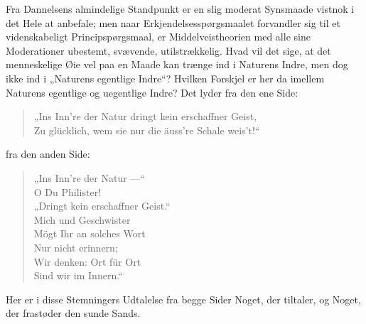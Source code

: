 \documentclass[11pt]{book}
\newcommand{\opage}[1]{\marginnote{\footnotesize\textit{[#1]}}}
\begin{document}
Fra Dannelsens almindelige Standpunkt er en slig moderat Synsmaade
vistnok i det Hele at anbefale; men naar Erkjendelsesspørgsmaalet
forvandler sig til et videnskabeligt Principspørgsmaal, er
Middelveistheorien med alle sine Moderationer ubestemt, svævende,
utilstrækkelig. Hvad vil det sige, at det menneskelige Øie vel paa en
Maade kan trænge ind i Naturens Indre, men dog ikke ind i „Naturens
egentlige Indre“? Hvilken Forskjel er her da imellem Naturens egentlige
og uegentlige Indre? Det lyder fra den ene Side:
\begin{quote}
„Ins Inn're der Natur dringt kein erschaffner Geist,\\
Zu glücklich, wem sie nur die äuss're Schale weis't!“
\end{quote}
fra den anden Side:
\begin{quote}
„Ins Inn're der Natur ---“\\
O Du Philister!\\
„Dringt kein erschaffner Geist.“\\
Mich und Geschwister\\
Mögt Ihr an solches Wort\\
Nur nicht erinnern;\\
Wir denken: Ort für Ort\\
Sind wir im Innern.“
\end{quote}

\opage{288} \setcounter{footnote}{0}%
Her er i disse Stemningers Udtalelse fra begge Sider Noget, der
tiltaler, og Noget, der frastøder den sunde Sands.
\end{document}
